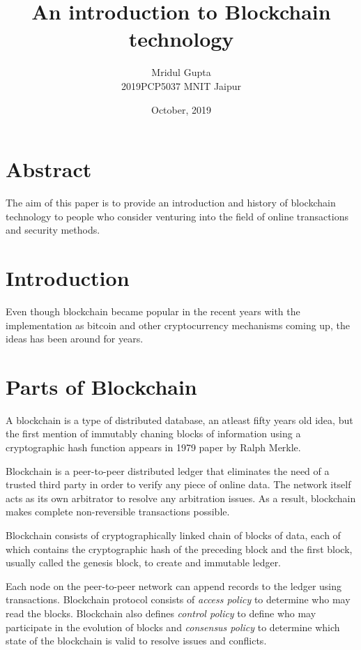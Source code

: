 \documentclass[12pt]{article}
\title{An introduction to Blockchain technology}
\author{Mridul Gupta\\2019PCP5037 MNIT Jaipur}
\date{October, 2019}
\begin{document}
\maketitle
\section*{Abstract}
The aim of this paper is to provide an introduction and history of blockchain technology to people who consider venturing into the field of online transactions and security methods.

\begin{multicols}{2}

\section{Introduction}
Even though blockchain became popular in the recent years with the implementation as bitcoin\cite{Nak} and other cryptocurrency mechanisms coming up, the ideas has been around for years.

\section{Parts of Blockchain}
A blockchain is a type of distributed database, an atleast fifty years old idea, but the first mention of immutably chaning blocks of information using a cryptographic hash function appears in 1979 paper by Ralph Merkle\cite{Mer}.\par

Blockchain is a peer-to-peer distributed ledger that eliminates the need of a trusted third party in order to verify any piece of online data. The network itself acts as its own arbitrator to resolve any arbitration issues. As a result, blockchain makes complete non-reversible transactions possible\cite{Nak}.\par

Blockchain consists of cryptographically linked chain of blocks of data, each of which contains the cryptographic hash of the preceding block and the first block, usually called the genesis block, to create and immutable ledger.\par

Each node on the peer-to-peer network can append records to the ledger using transactions\cite{ieee}. Blockchain protocol consists of \textit{access policy} to determine who may read the blocks. Blockchain also defines \textit{control policy} to define who may participate in the evolution of blocks and \textit{consensus policy} to determine which state of the blockchain is valid to resolve issues and conflicts\cite{Alan}\cite{Nak}.
\end{multicols}
\end{document}
